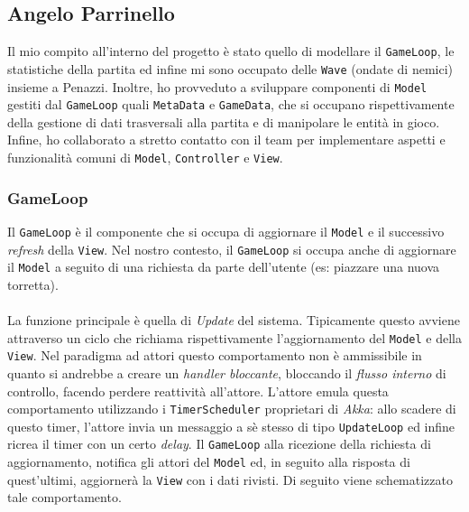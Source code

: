 \subsection{Angelo Parrinello}
Il mio compito all’interno del progetto è stato quello di modellare il \texttt{GameLoop}, le statistiche della partita ed infine mi sono occupato delle \texttt{Wave} (ondate di nemici) insieme a Penazzi. Inoltre, ho provveduto a sviluppare componenti di \texttt{Model} gestiti dal \texttt{GameLoop} quali \texttt{MetaData} e \texttt{GameData}, che si occupano rispettivamente della gestione di dati trasversali alla partita e di manipolare le entità in gioco. Infine, ho collaborato a stretto contatto con il team per implementare aspetti e funzionalità comuni di \texttt{Model}, \texttt{Controller} e \texttt{View}. 

\subsubsection{GameLoop}
Il \texttt{GameLoop} è il componente che si occupa di aggiornare il \texttt{Model} e il successivo \textit{refresh} della \texttt{View}. Nel nostro contesto, il \texttt{GameLoop} si occupa anche di aggiornare il \texttt{Model} a seguito di una richiesta da parte dell'utente (es: piazzare una nuova torretta).\\
\\La funzione principale è quella di \textit{Update} del sistema. Tipicamente questo avviene attraverso un ciclo che richiama rispettivamente l'aggiornamento del \texttt{Model} e della \texttt{View}. Nel paradigma ad attori questo comportamento non è ammissibile in quanto si andrebbe a creare un \textit{handler bloccante}, bloccando il \textit{flusso interno} di controllo, facendo perdere reattività all'attore. L'attore emula questa comportamento utilizzando i \texttt{TimerScheduler} proprietari di \textit{Akka}: allo scadere di questo timer, l'attore invia un messaggio a sè stesso di tipo \texttt{UpdateLoop} ed infine ricrea il timer con un certo \textit{delay}. Il \texttt{GameLoop} alla ricezione della richiesta di aggiornamento, notifica gli attori del \texttt{Model} ed, in seguito alla risposta di quest'ultimi, aggiornerà la \texttt{View} con i dati rivisti. Di seguito viene schematizzato tale comportamento.

